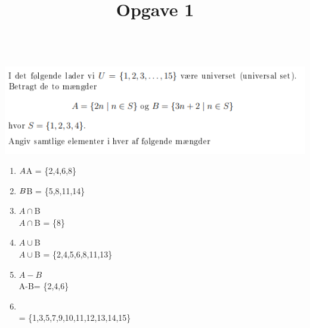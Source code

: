 \documentclass{article}
\begin{document}
\title{
\normalsize \normalfont
\textbf{Opgave 1}}
\\
\includegraphics[width=1.0 \textwidth]{Reeksamen.PNG}
\begin{enumerate}[label=(\Alph*)]
\item $A
\\
$A = \big\{2,4,6,8\big\}
\\

\item $B 
\\
$B = \big\{5,8,11,14\big\}
\\

\item $A \cap $B 
\\
$A \cap $B = \big\{8\big\}
\\

\item $A\cup$B 
\\
$A\cup$B = \big\{2,4,5,6,8,11,13\big\}
\\

\item $A-B$
\\
A-B= \big\{2,4,6\big\}
\\

\item {}
\\ 
 = \big\{1,3,5,7,9,10,11,12,13,14,15\big\}
\\

\end{enumerate}
\\
\end{document}
